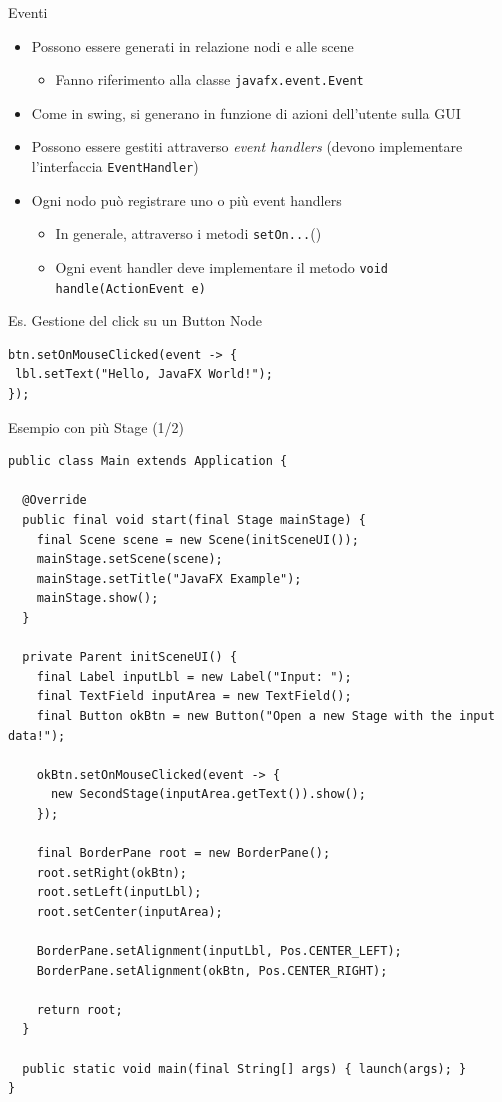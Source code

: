 \documentclass[presentation]{beamer}
\begin{document}
\begin{frame}[fragile]{Eventi}
\begin{itemize}\itemsep10pt
\item Possono essere generati in relazione nodi e alle scene
\begin{itemize}
\item Fanno riferimento alla classe \texttt{javafx.event.Event}
\end{itemize}
\item Come in swing, si generano in funzione di azioni dell'utente sulla GUI
\item Possono essere gestiti attraverso \emph{event handlers} (devono implementare l'interfaccia \texttt{EventHandler})
\item Ogni nodo può registrare uno o più event handlers
\begin{itemize}
\item In generale, attraverso i metodi \texttt{setOn...}()
\item Ogni event handler deve implementare il metodo \texttt{void handle(ActionEvent e)}
\end{itemize}
\end{itemize}

\begin{block}{Es. Gestione del click su un Button Node}
\begin{lstlisting}
btn.setOnMouseClicked(event -> {
 lbl.setText("Hello, JavaFX World!");
});
\end{lstlisting}
\end{block}
\end{frame}

\begin{frame}[fragile]{Esempio con più Stage (1/2)}
\begin{lstlisting}[basicstyle=\tiny]
public class Main extends Application {

  @Override
  public final void start(final Stage mainStage) {
    final Scene scene = new Scene(initSceneUI());
    mainStage.setScene(scene);
    mainStage.setTitle("JavaFX Example");
    mainStage.show();
  }

  private Parent initSceneUI() {
    final Label inputLbl = new Label("Input: ");
    final TextField inputArea = new TextField();
    final Button okBtn = new Button("Open a new Stage with the input data!");

    okBtn.setOnMouseClicked(event -> {
      new SecondStage(inputArea.getText()).show();
    });

    final BorderPane root = new BorderPane();
    root.setRight(okBtn);
    root.setLeft(inputLbl);
    root.setCenter(inputArea);

    BorderPane.setAlignment(inputLbl, Pos.CENTER_LEFT);
    BorderPane.setAlignment(okBtn, Pos.CENTER_RIGHT);

    return root;
  }

  public static void main(final String[] args) { launch(args); }
}
\end{lstlisting}
\end{frame}
\end{document}
